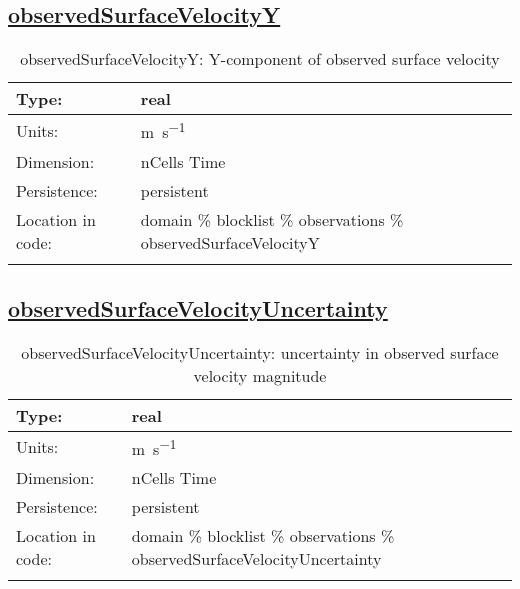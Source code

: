 \subsection[observedSurfaceVelocityY]{\hyperref[sec:var_tab_observations]{observedSurfaceVelocityY}}
\label{subsec:var_sec_observations_observedSurfaceVelocityY}
\begin{center}
\begin{longtable}{| p{2.0in} | p{4.0in} |}
        \hline 
        Type: & real \\
        \hline 
        Units: & \si{m.s^{-1}} \\
        \hline 
        Dimension: & nCells Time \\
        \hline 
        Persistence: & persistent \\
        \hline 
         Location in code: & domain \% blocklist \% observations \% observedSurfaceVelocityY \\
         \hline 
    \caption{observedSurfaceVelocityY: Y-component of observed surface velocity}
\end{longtable}
\end{center}
\subsection[observedSurfaceVelocityUncertainty]{\hyperref[sec:var_tab_observations]{observedSurfaceVelocityUncertainty}}
\label{subsec:var_sec_observations_observedSurfaceVelocityUncertainty}
\begin{center}
\begin{longtable}{| p{2.0in} | p{4.0in} |}
        \hline 
        Type: & real \\
        \hline 
        Units: & \si{m.s^{-1}} \\
        \hline 
        Dimension: & nCells Time \\
        \hline 
        Persistence: & persistent \\
        \hline 
         Location in code: & domain \% blocklist \% observations \% observedSurfaceVelocityUncertainty \\
         \hline 
    \caption{observedSurfaceVelocityUncertainty: uncertainty in observed surface velocity magnitude}
\end{longtable}
\end{center}
